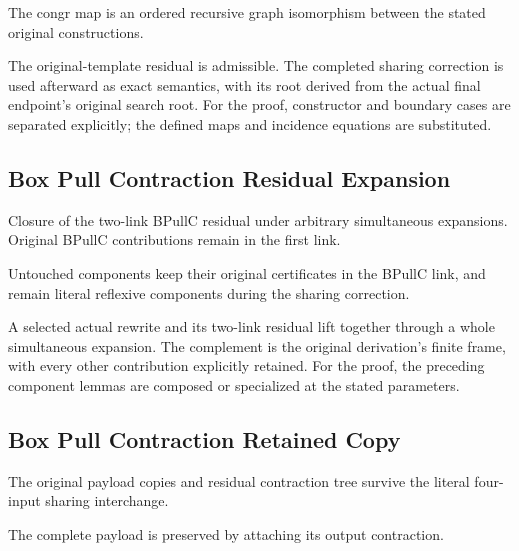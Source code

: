 The congr map is an ordered recursive graph isomorphism between the stated original constructions.
\par{}

The original-template residual is admissible. The completed sharing correction is used afterward as exact semantics, with its root derived from the actual final endpoint's original search root.
For the proof, constructor and boundary cases are separated explicitly; the defined maps and incidence equations are substituted.
\par{}

\subsection{Box Pull Contraction Residual Expansion}
Closure of the two-link BPullC residual under arbitrary simultaneous expansions. Original BPullC contributions remain in the first link.

Untouched components keep their original certificates in the BPullC link, and remain literal reflexive components during the sharing correction.
\par{}

A selected actual rewrite and its two-link residual lift together through a whole simultaneous expansion. The complement is the original derivation's finite frame, with every other contribution explicitly retained.
For the proof, the preceding component lemmas are composed or specialized at the stated parameters.
\par{}

\subsection{Box Pull Contraction Retained Copy}
The original payload copies and residual contraction tree survive the literal four-input sharing interchange.

The complete payload is preserved by attaching its output contraction.
\par{}

